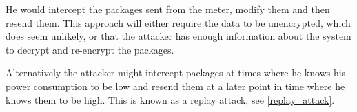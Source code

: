 He would intercept the packages sent from the meter, modify them and then resend them.
This approach will either require the data to be unencrypted, which does seem unlikely, or that the attacker has enough information about the system to decrypt and re-encrypt the packages.

Alternatively the attacker might intercept packages at times where he knows his power consumption to be low and resend them at a later point in time where he knows them to be high.
This is known as a replay attack, see \cref{replay_attack}.
